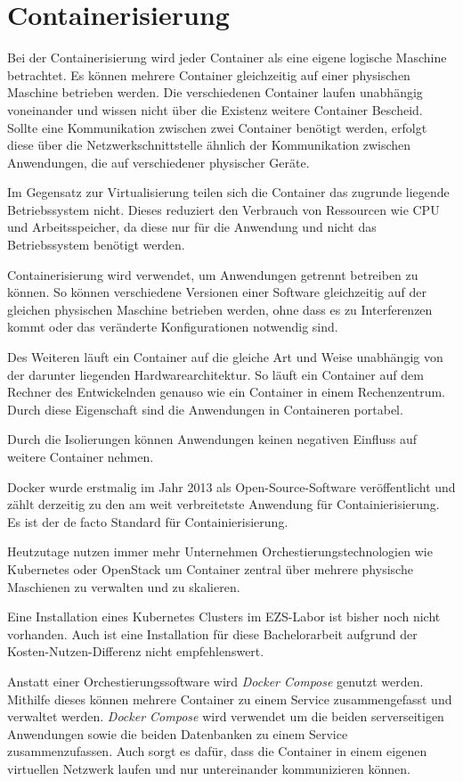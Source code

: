 \section{Containerisierung} \label{sec:Containerisierung}
Bei der Containerisierung wird jeder Container als eine eigene logische Maschine betrachtet. Es können mehrere Container gleichzeitig auf einer physischen Maschine betrieben werden. 
Die verschiedenen Container laufen unabhängig voneinander und wissen nicht über die Existenz weitere Container Bescheid. Sollte eine Kommunikation zwischen zwei Container benötigt werden, erfolgt diese über die Netzwerkschnittstelle ähnlich der Kommunikation zwischen Anwendungen, die auf verschiedener physischer Geräte.

Im Gegensatz zur Virtualisierung teilen sich die Container das zugrunde liegende Betriebssystem nicht. Dieses reduziert den Verbrauch von Ressourcen wie CPU und Arbeitsspeicher, da diese nur für die Anwendung und nicht das Betriebssystem benötigt werden.

Containerisierung wird verwendet, um Anwendungen getrennt betreiben zu können. So können verschiedene Versionen einer Software gleichzeitig auf der gleichen physischen Maschine betrieben werden, ohne dass es zu Interferenzen kommt oder das veränderte Konfigurationen notwendig sind.

Des Weiteren läuft ein Container auf die gleiche Art und Weise unabhängig von der darunter liegenden Hardwarearchitektur. So läuft ein Container auf dem Rechner des Entwickelnden genauso wie ein Container in einem Rechenzentrum. Durch diese Eigenschaft sind die Anwendungen in Containeren portabel.

Durch die Isolierungen können Anwendungen keinen negativen Einfluss auf weitere Container nehmen.

Docker wurde erstmalig im Jahr 2013 als Open-Source-Software veröffentlicht und zählt derzeitig zu den am weit verbreitetste Anwendung für Containierisierung. Es ist der de facto Standard für Containierisierung. 
\cite{boersmaContainerizationDefinitionBest2019}

Heutzutage nutzen immer mehr Unternehmen Orchestierungstechnologien wie Kubernetes oder OpenStack um Container zentral über mehrere physische Maschienen zu verwalten und zu skalieren.
\cite{gaviganHistoryAngular2018}

Eine Installation eines Kubernetes Clusters im EZS-Labor ist bisher noch nicht vorhanden. Auch ist eine Installation für diese Bachelorarbeit aufgrund der Kosten-Nutzen-Differenz nicht empfehlenswert.

Anstatt einer Orchestierungssoftware wird \textit{Docker Compose} genutzt werden.
Mithilfe dieses können mehrere Container zu einem Service zusammengefasst und verwaltet werden. \textit{Docker Compose} wird verwendet um die beiden serverseitigen Anwendungen sowie die beiden Datenbanken zu einem Service zusammenzufassen. Auch sorgt es dafür, dass die Container in einem eigenen virtuellen Netzwerk laufen und nur untereinander kommunizieren können. \cite{dockerinc.OverviewDockerCompose2020} 